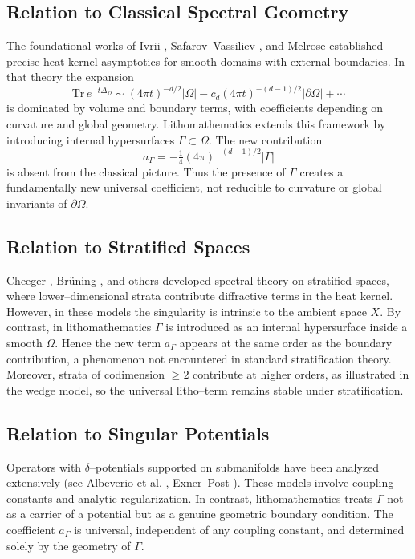 \subsection{Relation to Classical Spectral Geometry}

The foundational works of Ivrii \cite{Ivrii80}, Safarov--Vassiliev \cite{Safarov96}, 
and Melrose \cite{Melrose94} established precise heat kernel asymptotics 
for smooth domains with external boundaries. 
In that theory the expansion
\[
\mathrm{Tr}\,e^{-t\Delta_\Omega} \sim (4\pi t)^{-d/2}|\Omega| 
 - c_d(4\pi t)^{-(d-1)/2}|\partial \Omega| + \cdots
\]
is dominated by volume and boundary terms, 
with coefficients depending on curvature and global geometry. 
Lithomathematics extends this framework by introducing internal 
hypersurfaces $\Gamma \subset \Omega$. 
The new contribution
\[
a_\Gamma = -\tfrac{1}{4}(4\pi)^{-(d-1)/2}|\Gamma|
\]
is absent from the classical picture. 
Thus the presence of $\Gamma$ creates a fundamentally new 
universal coefficient, not reducible to curvature or global invariants 
of $\partial \Omega$. 

\subsection{Relation to Stratified Spaces}

Cheeger \cite{Cheeger83}, Brüning \cite{Bruening84}, and others 
developed spectral theory on stratified spaces, 
where lower--dimensional strata contribute 
diffractive terms in the heat kernel. 
However, in these models the singularity is intrinsic to the ambient 
space $X$. By contrast, in lithomathematics $\Gamma$ is introduced 
as an internal hypersurface inside a smooth $\Omega$. 
Hence the new term $a_\Gamma$ appears at the same order as the 
boundary contribution, a phenomenon not encountered 
in standard stratification theory. 
Moreover, strata of codimension $\geq 2$ contribute at higher orders, 
as illustrated in the wedge model, 
so the universal litho--term remains stable under stratification. 

\subsection{Relation to Singular Potentials}

Operators with $\delta$--potentials supported on submanifolds 
have been analyzed extensively (see Albeverio et al. \cite{Albeverio05}, 
Exner--Post \cite{Exner07}). 
These models involve coupling constants and analytic regularization. 
In contrast, lithomathematics treats $\Gamma$ not as a carrier of 
a potential but as a genuine geometric boundary condition. 
The coefficient $a_\Gamma$ is universal, independent of any 
coupling constant, and determined solely by the geometry of $\Gamma$. 

